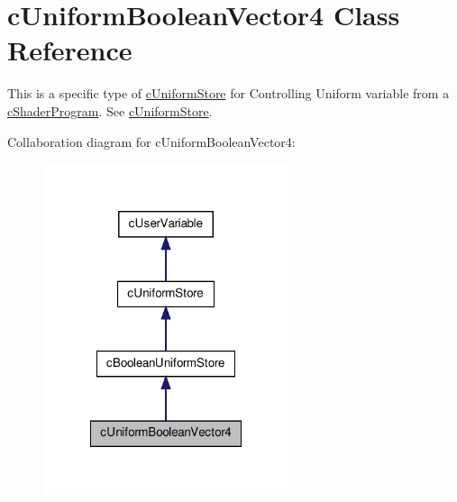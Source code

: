 \hypertarget{classc_uniform_boolean_vector4}{
\section{cUniformBooleanVector4 Class Reference}
\label{classc_uniform_boolean_vector4}
}


This is a specific type of \hyperlink{classc_uniform_store}{cUniformStore} for Controlling Uniform variable from a \hyperlink{classc_shader_program}{cShaderProgram}. See \hyperlink{classc_uniform_store}{cUniformStore}.  




Collaboration diagram for cUniformBooleanVector4:\nopagebreak
\begin{figure}[H]
\begin{center}
\leavevmode
\includegraphics[width=204pt]{classc_uniform_boolean_vector4__coll__graph}
\end{center}
\end{figure}
